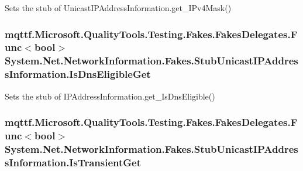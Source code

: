 Sets the stub of Unicast\-I\-P\-Address\-Information.\-get\-\_\-\-I\-Pv4\-Mask()

\hypertarget{class_system_1_1_net_1_1_network_information_1_1_fakes_1_1_stub_unicast_i_p_address_information_a142339e7e2540702a0c3613524f383bd}{
\subsubsection[{Is\-Dns\-Eligible\-Get}]{\setlength{\rightskip}{0pt plus 5cm}mqttf.\-Microsoft.\-Quality\-Tools.\-Testing.\-Fakes.\-Fakes\-Delegates.\-Func$<$bool$>$ System.\-Net.\-Network\-Information.\-Fakes.\-Stub\-Unicast\-I\-P\-Address\-Information.\-Is\-Dns\-Eligible\-Get}}\label{class_system_1_1_net_1_1_network_information_1_1_fakes_1_1_stub_unicast_i_p_address_information_a142339e7e2540702a0c3613524f383bd}


Sets the stub of I\-P\-Address\-Information.\-get\-\_\-\-Is\-Dns\-Eligible()

\hypertarget{class_system_1_1_net_1_1_network_information_1_1_fakes_1_1_stub_unicast_i_p_address_information_a21342ab9caf74e5e7c94f47f26970698}{
\subsubsection[{Is\-Transient\-Get}]{\setlength{\rightskip}{0pt plus 5cm}mqttf.\-Microsoft.\-Quality\-Tools.\-Testing.\-Fakes.\-Fakes\-Delegates.\-Func$<$bool$>$ System.\-Net.\-Network\-Information.\-Fakes.\-Stub\-Unicast\-I\-P\-Address\-Information.\-Is\-Transient\-Get}}\label{class_system_1_1_net_1_1_network_information_1_1_fakes_1_1_stub_unicast_i_p_address_information_a21342ab9caf74e5e7c94f47f26970698}


